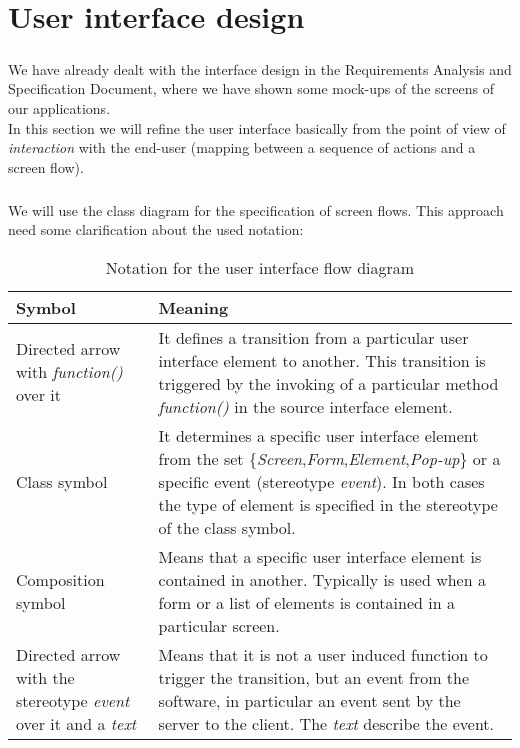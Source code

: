 \chapter{User interface design}\label{chapter:userInterfaceDesign}
\paragraph{}We have already dealt with the interface design in the Requirements Analysis and Specification Document, where we have shown some mock-ups of the screens of our applications.\\ In this section we will refine the user interface basically from the point of view of \textit{interaction} with the end-user (mapping between a sequence of actions and a screen flow).
\paragraph{} We will use the class diagram for the specification of screen flows. This approach need some clarification about the used notation:
\begin{table}[H]
\begin{longtable}{| p{} | p{} |}
\hline
\textbf{Symbol} & {\centering \textbf{Meaning}} \\ \hline
Directed arrow with \textit{function()} over it & It defines a transition from a particular user interface element to another. This transition is triggered by the invoking of a particular method \textit{function()} in the source interface element. \\ \hline
Class symbol & It determines a specific user interface element from the set \{\textit{Screen},\textit{Form},\textit{Element},\textit{Pop-up}\}
or a specific event (stereotype \textit{event}). In both cases the type of element is specified in the stereotype of the class symbol. \\ \hline
Composition symbol & Means that a specific user interface element is contained in another. Typically is used when a form or a list of elements is contained in a particular screen. \\ \hline
Directed arrow with the stereotype \textit{event} over it and a \textit{text} & Means that it is not a user induced function to trigger the transition, but an event from the software, in particular an event sent by the server to the client. The \textit{text} describe the event.\\ \hline
\end{longtable}
\caption{Notation for the user interface flow diagram}
\label{tab:userInterfaceDefinitions}
\end{table}

